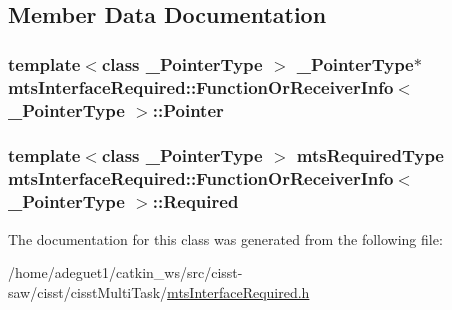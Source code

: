 \subsection{Member Data Documentation}
\hypertarget{classmts_interface_required_1_1_function_or_receiver_info_ab4394777d1e10c3d4ea888e0d5d90d85}{
\subsubsection[{Pointer}]{\setlength{\rightskip}{0pt plus 5cm}template$<$class \-\_\-\-Pointer\-Type $>$ \-\_\-\-Pointer\-Type$\ast$ {\bf mts\-Interface\-Required\-::\-Function\-Or\-Receiver\-Info}$<$ \-\_\-\-Pointer\-Type $>$\-::Pointer\hspace{0.3cm}{\ttfamily [protected]}}}\label{classmts_interface_required_1_1_function_or_receiver_info_ab4394777d1e10c3d4ea888e0d5d90d85}
\hypertarget{classmts_interface_required_1_1_function_or_receiver_info_a6459b7ea33ff75f81cc0c48e1c12cc3a}{
\subsubsection[{Required}]{\setlength{\rightskip}{0pt plus 5cm}template$<$class \-\_\-\-Pointer\-Type $>$ {\bf mts\-Required\-Type} {\bf mts\-Interface\-Required\-::\-Function\-Or\-Receiver\-Info}$<$ \-\_\-\-Pointer\-Type $>$\-::Required\hspace{0.3cm}{\ttfamily [protected]}}}\label{classmts_interface_required_1_1_function_or_receiver_info_a6459b7ea33ff75f81cc0c48e1c12cc3a}


The documentation for this class was generated from the following file\-:\begin{DoxyCompactItemize}
\item 
/home/adeguet1/catkin\-\_\-ws/src/cisst-\/saw/cisst/cisst\-Multi\-Task/\hyperlink{mts_interface_required_8h}{mts\-Interface\-Required.\-h}\end{DoxyCompactItemize}

